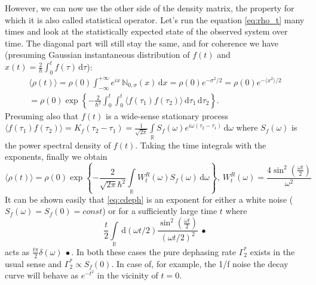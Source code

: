 \documentclass[12pt, twoside]{report}
\newcommand{\diff}{\,\mathrm{d}}
\numberwithin{equation}{section}
\begin{document}
However, we can now use the other side of the density matrix, the property for which it is also called statistical operator. Let's run the equation \eqref{eq:rho_t} many times and look at the statistically expected state of the observed system over time. The diagonal part will still stay the same, and for coherence we have (presuming Gaussian instantaneous distribution of $f(t)$ and $x(t) = \frac{2}{\hbar}\int_0^t f(\tau)  \diff \tau$):
\begin{gather}
\langle \rho(t) \rangle = \rho(0) \int_{-\infty}^{+\infty} e^{ix}\, \mathbb{N}_{0,\sigma}(x) \diff x = \rho(0) e^{-\sigma^2/2} = \rho(0) e^{-\langle x^2 \rangle/2} \\
= \rho(0)\exp \left\{ -\frac{2}{\hbar^2}\int_0^t\int_0^t \langle f(\tau_1) f(\tau_2) \rangle \diff \tau_1 \diff \tau_2 \right\}.
\end{gather}
Presuming also that $f(t)$ is a wide-sense stationary process $\langle f(\tau_1) f(\tau_2) \rangle = K_f(\tau_2 - \tau_1) = \frac{1}{\sqrt{2\pi}}\int\limits_\mathbb{R} S_f(\omega) e^{i\omega(\tau_2-\tau_1)}\diff\omega$ where $S_f(\omega)$ is the power spectral density of $f(t)$. Taking the time integrals with the exponents, finally we obtain
\begin{equation}
\langle \rho(t) \rangle = \rho(0) \exp  \left\{-\frac{2}{\sqrt{2\pi}\hbar^2} \int\limits_\mathbb{R} W_t^R(\omega) S_f(\omega)\diff \omega \right\},\  W_t^R(\omega)  = \frac{4 \sin^2(\frac{\omega t}{2})}{\omega^2}\label{eq:cdeph}
\end{equation}
It can be shown easily that \eqref{eq:cdeph} is an exponent for either a white noise ($S_f(\omega) = S_f(0) = const$) or for a sufficiently large time $t$ where 
$$\frac{t}{2}\int\limits_\mathbb{R} \diff(\omega t/2) \frac{\sin^2(\frac{\omega t}{2})}{(\omega t/2)^2} \ \bullet $$
acts as $ \frac{t\pi}{2}\delta(\omega)\ \bullet$. In both these cases the pure dephasing rate $\Gamma^*_2$ exists in the usual sense and $\Gamma^*_2 \propto S_f(0)$. In case of, for example, the 1/f noise the decay curve will behave as $e^{-t^2}$ in the vicinity of $t=0$.
\end{document}
